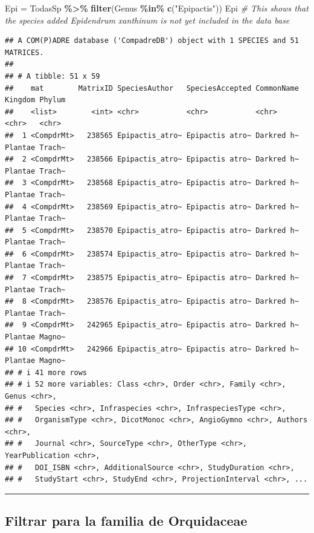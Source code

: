 \documentclass[
]{book}
\newenvironment{Shaded}{\begin{snugshade}}{\end{snugshade}}
\newcommand{\CommentTok}[1]{\textcolor[rgb]{0.56,0.35,0.01}{\textit{#1}}}
\newcommand{\FunctionTok}[1]{\textcolor[rgb]{0.13,0.29,0.53}{\textbf{#1}}}
\newcommand{\NormalTok}[1]{#1}
\newcommand{\OtherTok}[1]{\textcolor[rgb]{0.56,0.35,0.01}{#1}}
\newcommand{\SpecialCharTok}[1]{\textcolor[rgb]{0.81,0.36,0.00}{\textbf{#1}}}
\newcommand{\StringTok}[1]{\textcolor[rgb]{0.31,0.60,0.02}{#1}}
\theoremstyle{definition}
\theoremstyle{definition}
\theoremstyle{definition}
\theoremstyle{definition}
\theoremstyle{remark}
\begin{document}
\begin{Shaded}
\begin{Highlighting}[]
\NormalTok{Epi }\OtherTok{=}\NormalTok{ TodasSp }\SpecialCharTok{\%\textgreater{}\%} 
  \FunctionTok{filter}\NormalTok{(Genus }\SpecialCharTok{\%in\%} \FunctionTok{c}\NormalTok{(}\StringTok{"Epipactis"}\NormalTok{))}
\NormalTok{Epi }\CommentTok{\# This shows that the species added Epidendrum xanthinum is not yet included in the data base}
\end{Highlighting}
\end{Shaded}

\begin{verbatim}
## A COM(P)ADRE database ('CompadreDB') object with 1 SPECIES and 51 MATRICES.
## 
## # A tibble: 51 x 59
##    mat        MatrixID SpeciesAuthor   SpeciesAccepted CommonName Kingdom Phylum
##    <list>        <int> <chr>           <chr>           <chr>      <chr>   <chr> 
##  1 <CompdrMt>   238565 Epipactis_atro~ Epipactis atro~ Darkred h~ Plantae Trach~
##  2 <CompdrMt>   238566 Epipactis_atro~ Epipactis atro~ Darkred h~ Plantae Trach~
##  3 <CompdrMt>   238568 Epipactis_atro~ Epipactis atro~ Darkred h~ Plantae Trach~
##  4 <CompdrMt>   238569 Epipactis_atro~ Epipactis atro~ Darkred h~ Plantae Trach~
##  5 <CompdrMt>   238570 Epipactis_atro~ Epipactis atro~ Darkred h~ Plantae Trach~
##  6 <CompdrMt>   238574 Epipactis_atro~ Epipactis atro~ Darkred h~ Plantae Trach~
##  7 <CompdrMt>   238575 Epipactis_atro~ Epipactis atro~ Darkred h~ Plantae Trach~
##  8 <CompdrMt>   238576 Epipactis_atro~ Epipactis atro~ Darkred h~ Plantae Trach~
##  9 <CompdrMt>   242965 Epipactis_atro~ Epipactis atro~ Darkred h~ Plantae Magno~
## 10 <CompdrMt>   242966 Epipactis_atro~ Epipactis atro~ Darkred h~ Plantae Magno~
## # i 41 more rows
## # i 52 more variables: Class <chr>, Order <chr>, Family <chr>, Genus <chr>,
## #   Species <chr>, Infraspecies <chr>, InfraspeciesType <chr>,
## #   OrganismType <chr>, DicotMonoc <chr>, AngioGymno <chr>, Authors <chr>,
## #   Journal <chr>, SourceType <chr>, OtherType <chr>, YearPublication <chr>,
## #   DOI_ISBN <chr>, AdditionalSource <chr>, StudyDuration <chr>,
## #   StudyStart <chr>, StudyEnd <chr>, ProjectionInterval <chr>, ...
\end{verbatim}

\begin{center}\rule{0.5\linewidth}{0.5pt}\end{center}

\subsection{Filtrar para la familia de Orquidaceae}\label{filtrar-para-la-familia-de-orquidaceae}
\end{document}
